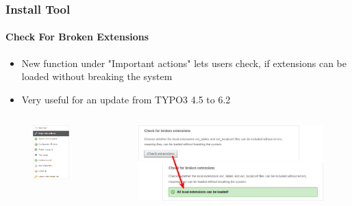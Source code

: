\begin{frame}[fragile]
	\frametitle{Install Tool}
	\framesubtitle{Check For Broken Extensions}

	\begin{itemize}
		\item New function under "Important actions" lets users check,\newline
			if extensions can be loaded without breaking the system
		\item Very useful for an update from TYPO3 4.5 to 6.2
	\end{itemize}

	\begin{columns}[T]
		\begin{column}{.3\textwidth}
			\begin{figure}\vspace*{-0.4cm}
				\includegraphics[width=0.7\linewidth]{Images/InstallTool/ImportantActions.png}
			\end{figure}
		\end{column}
		\begin{column}{.7\textwidth}
			\begin{figure}\vspace*{-0.4cm}
				\includegraphics[width=1\linewidth]{Images/InstallTool/CheckForBrokenExtensions.png}
			\end{figure}
		\end{column}
	\end{columns}


\end{frame}
